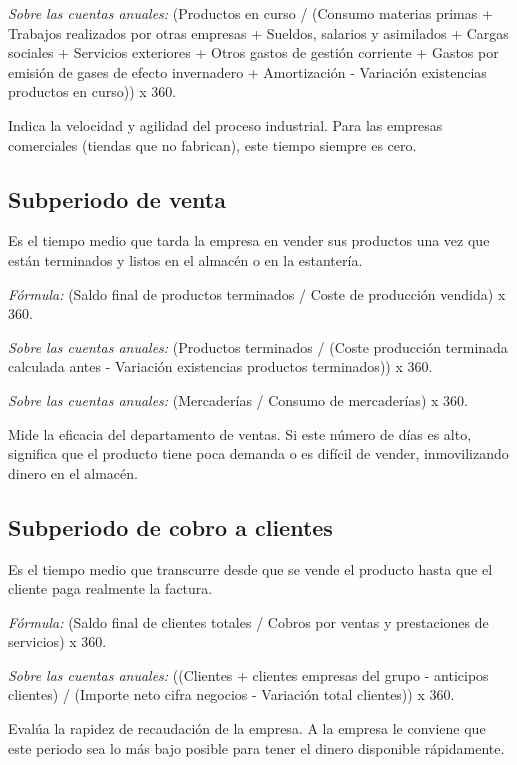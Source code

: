 \documentclass[12pt]{book} %
\begin{document}
\emph{Sobre las cuentas anuales:} (Productos en curso / (Consumo
materias primas + Trabajos realizados por otras empresas + Sueldos,
salarios y asimilados + Cargas sociales + Servicios exteriores + Otros
gastos de gestión corriente + Gastos por emisión de gases de efecto
invernadero + Amortización - Variación existencias productos en curso))
x 360.

Indica la velocidad y agilidad del proceso industrial. Para las empresas
comerciales (tiendas que no fabrican), este tiempo siempre es cero.

\hypertarget{subperiodo-de-venta}{%
\subsection{Subperiodo de venta}\label{subperiodo-de-venta}}

Es el tiempo medio que tarda la empresa en vender sus productos una vez
que están terminados y listos en el almacén o en la estantería.

\emph{Fórmula:} (Saldo final de productos terminados / Coste de
producción vendida) x 360.

\emph{Sobre las cuentas anuales:} (Productos terminados / (Coste
producción terminada calculada antes - Variación existencias productos
terminados)) x 360.

\emph{Sobre las cuentas anuales:} (Mercaderías / Consumo de mercaderías)
x 360.

Mide la eficacia del departamento de ventas. Si este número de días es
alto, significa que el producto tiene poca demanda o es difícil de
vender, inmovilizando dinero en el almacén.

\hypertarget{subperiodo-de-cobro-a-clientes}{%
\subsection{Subperiodo de cobro a
clientes}\label{subperiodo-de-cobro-a-clientes}}

Es el tiempo medio que transcurre desde que se vende el producto hasta
que el cliente paga realmente la factura.

\emph{Fórmula:} (Saldo final de clientes totales / Cobros por ventas y
prestaciones de servicios) x 360.

\emph{Sobre las cuentas anuales:} ((Clientes + clientes empresas del
grupo - anticipos clientes) / (Importe neto cifra negocios - Variación
total clientes)) x 360.

Evalúa la rapidez de recaudación de la empresa. A la empresa le conviene
que este periodo sea lo más bajo posible para tener el dinero disponible
rápidamente.
\end{document}
